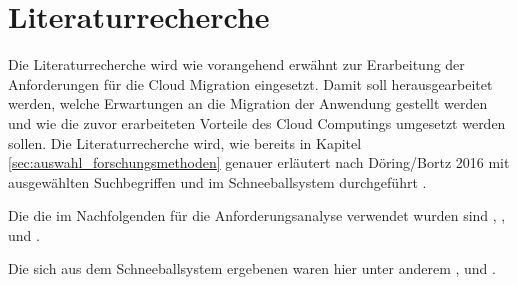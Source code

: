 \section{Literaturrecherche}
Die Literaturrecherche wird wie vorangehend erwähnt zur Erarbeitung der Anforderungen für die Cloud Migration eingesetzt. Damit soll herausgearbeitet werden, welche Erwartungen an die Migration der Anwendung gestellt werden und wie die zuvor erarbeiteten Vorteile des Cloud Computings umgesetzt werden sollen. Die Literaturrecherche wird, wie bereits in Kapitel \ref{sec:auswahl_forschungsmethoden} genauer erläutert nach Döring/Bortz 2016 mit ausgewählten Suchbegriffen und im Schneeballsystem durchgeführt \cite[S. 158ff]{Doering2016}.

Die \grqq{} \cite[S. 158]{Doering2016} die im Nachfolgenden für die Anforderungsanalyse verwendet wurden sind \grqq{}, \grqq{}, \grqq{} und \grqq{}.

Die sich aus dem Schneeballsystem ergebenen \grqq{} \cite[S. 158]{Doering2016} waren hier unter anderem \grqq{}, \grqq{} und \grqq{}. \pagebreak